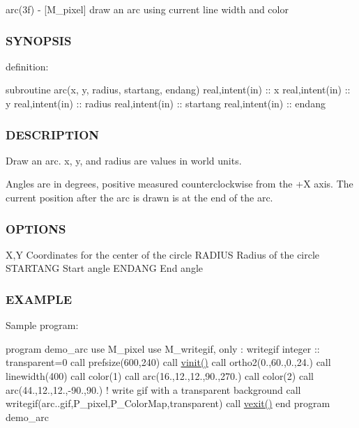 arc(3f) -\/ \mbox{[}M\+\_\+pixel\mbox{]} draw an arc using current line width and color 

\subsubsection*{S\+Y\+N\+O\+P\+S\+IS}

definition\+:

subroutine arc(x, y, radius, startang, endang) real,intent(in) \+:\+: x real,intent(in) \+:\+: y real,intent(in) \+:\+: radius real,intent(in) \+:\+: startang real,intent(in) \+:\+: endang

\subsubsection*{D\+E\+S\+C\+R\+I\+P\+T\+I\+ON}

\begin{DoxyVerb}Draw an arc. x, y, and radius are values in world units.

Angles are in degrees, positive measured counterclockwise from the
+X axis. The current position after the arc is drawn is at the end
of the arc.
\end{DoxyVerb}


\subsubsection*{O\+P\+T\+I\+O\+NS}

X,Y Coordinates for the center of the circle R\+A\+D\+I\+US Radius of the circle S\+T\+A\+R\+T\+A\+NG Start angle E\+N\+D\+A\+NG End angle

\subsubsection*{E\+X\+A\+M\+P\+LE}

Sample program\+:

program demo\+\_\+arc use M\+\_\+pixel use M\+\_\+writegif, only \+: writegif integer \+:\+: transparent=0 call prefsize(600,240) call \hyperlink{namespacem__pixel_ac03ca8f23fdadb60599b6ea4dc87a6d9}{vinit()} call ortho2(0.,60.,0.,24.) call linewidth(400) call color(1) call arc(16.,12.,12.,90.,270.) call color(2) call arc(44.,12.,12.,-\/90.,90.) ! write gif with a transparent background call writegif(\textquotesingle{}arc..\+gif\textquotesingle{},P\+\_\+pixel,P\+\_\+\+Color\+Map,transparent) call \hyperlink{namespacem__pixel_a19ad6b65752322b0029a62cc0ebec3e8}{vexit()} end program demo\+\_\+arc 

